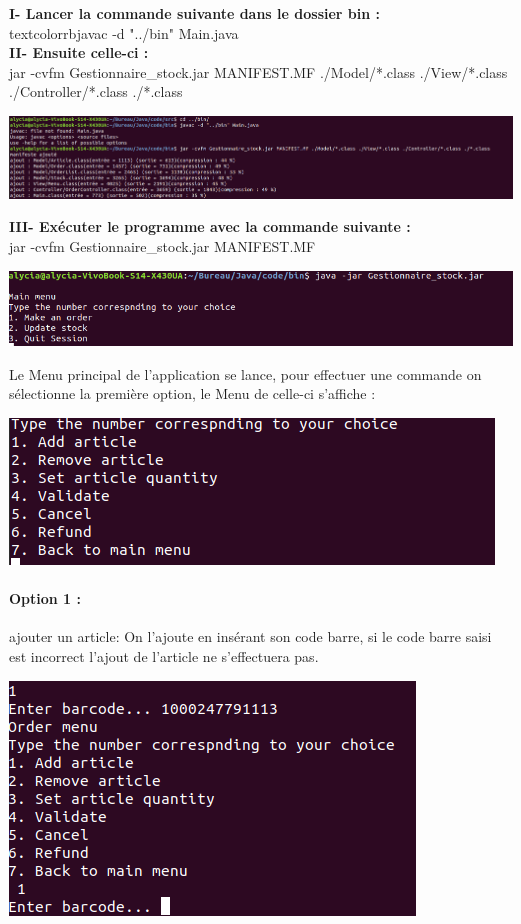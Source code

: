 \documentclass[french,10pt,a4paper]{report}
\begin{document}
\textbf{I- Lancer la commande suivante dans le dossier bin :}\\
textcolor{rb}{javac -d "../bin" Main.java}\\
\textbf{II- Ensuite celle-ci :}\\
\textcolor{rb}{jar -cvfm Gestionnaire\_stock.jar MANIFEST.MF ./Model/*.class ./View/*.class ./Controller/*.class ./*.class}
\begin{center}
	\includegraphics[scale=0.21]{captures/g_it3_5.png}
\end{center}
\textbf{III- Exécuter le programme avec la commande suivante :}\\
\textcolor{rb}{jar -cvfm Gestionnaire\_stock.jar MANIFEST.MF}
\begin{center}
	\includegraphics[scale=0.4]{captures/g_it3_6.png}
\end{center}
Le Menu principal de l’application se lance, pour effectuer une commande on sélectionne la première option, le Menu de celle-ci s’affiche :
\begin{center}
	\includegraphics[scale=0.4]{captures/g_it3_7.png}
\end{center}

\paragraph{\textbf{Option 1 :}} ajouter un article:
On l’ajoute en insérant son code barre, si le code barre saisi est incorrect l’ajout de l’article ne s’effectuera pas.
\begin{center}
	\includegraphics[scale=0.48]{captures/g_it3_8.png}
\end{center} 								
\end{document}
